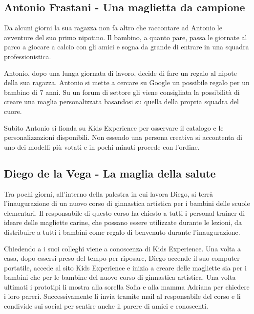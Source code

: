 \documentclass[12pt,italian,]{report}
\begin{document}
\hypertarget{antonio-frastani---una-maglietta-da-campione}{%
\subsection{Antonio Frastani - Una maglietta da
campione}\label{antonio-frastani---una-maglietta-da-campione}}

Da alcuni giorni la sua ragazza non fa altro che raccontare ad Antonio
le avventure del suo primo nipotino. Il bambino, a quanto pare, passa le
giornate al parco a giocare a calcio con gli amici e sogna da grande di
entrare in una squadra professionistica.

Antonio, dopo una lunga giornata di lavoro, decide di fare un regalo al
nipote della sua ragazza. Antonio si mette a cercare su Google un
possibile regalo per un bambino di 7 anni. Su un forum di settore gli
viene consigliata la possibilità di creare una maglia personalizzata
basandosi su quella della propria squadra del cuore.

Subito Antonio si fionda su Kids Experience per osservare il catalogo e
le personalizzazioni disponibili. Non essendo una persona creativa si
accontenta di uno dei modelli più votati e in pochi minuti procede con
l'ordine.

\hypertarget{diego-de-la-vega---la-maglia-della-salute}{%
\subsection{Diego de la Vega - La maglia della
salute}\label{diego-de-la-vega---la-maglia-della-salute}}

Tra pochi giorni, all'interno della palestra in cui lavora Diego, si
terrà l'inaugurazione di un nuovo corso di ginnastica artistica per i
bambini delle scuole elementari. Il responsabile di questo corso ha
chiesto a tutti i personal trainer di ideare delle magliette carine, che
possano essere utilizzate durante le lezioni, da distribuire a tutti i
bambini come regalo di benvenuto durante l'inaugurazione.

Chiedendo a i suoi colleghi viene a conoscenza di Kids Experience. Una
volta a casa, dopo essersi preso del tempo per riposare, Diego accende
il suo computer portatile, accede al sito Kids Experience e inizia a
creare delle magliette sia per i bambini che per le bambine del nuovo
corso di ginnastica artistica. Una volta ultimati i prototipi li mostra
alla sorella Sofia e alla mamma Adriana per chiedere i loro pareri.
Successivamente li invia tramite mail al responsabile del corso e li
condivide sui social per sentire anche il parere di amici e conoscenti.
\end{document}
